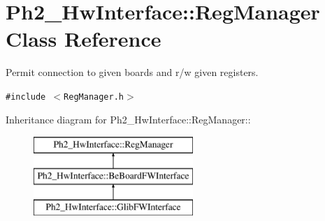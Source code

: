 \hypertarget{class_ph2___hw_interface_1_1_reg_manager}{
\section{Ph2\_\-Hw\-Interface::Reg\-Manager Class Reference}
\label{class_ph2___hw_interface_1_1_reg_manager}
}
Permit connection to given boards and r/w given registers.  


{\tt \#include $<$Reg\-Manager.h$>$}

Inheritance diagram for Ph2\_\-Hw\-Interface::Reg\-Manager::\begin{figure}[H]
\begin{center}
\leavevmode
\includegraphics[height=3cm]{class_ph2___hw_interface_1_1_reg_manager}
\end{center}
\end{figure}
